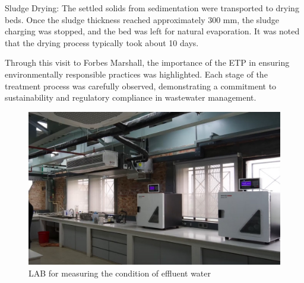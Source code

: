 Sludge Drying:
The settled solids from sedimentation were transported to drying beds. Once the sludge thickness reached approximately 300 mm, the sludge charging was stopped, and the bed was left for natural evaporation. It was noted that the drying process typically took about 10 days.

Through this visit to Forbes Marshall, the importance of the ETP in ensuring environmentally responsible practices was highlighted. Each stage of the treatment process was carefully observed, demonstrating a commitment to sustainability and regulatory compliance in wastewater management.
\begin{figure}[h!]
    \centering
    \includegraphics[width=0.8\linewidth]{figs/lab.jpg}
    \caption{LAB for measuring the condition of effluent water}
    \label{fig:LAB}
\end{figure}